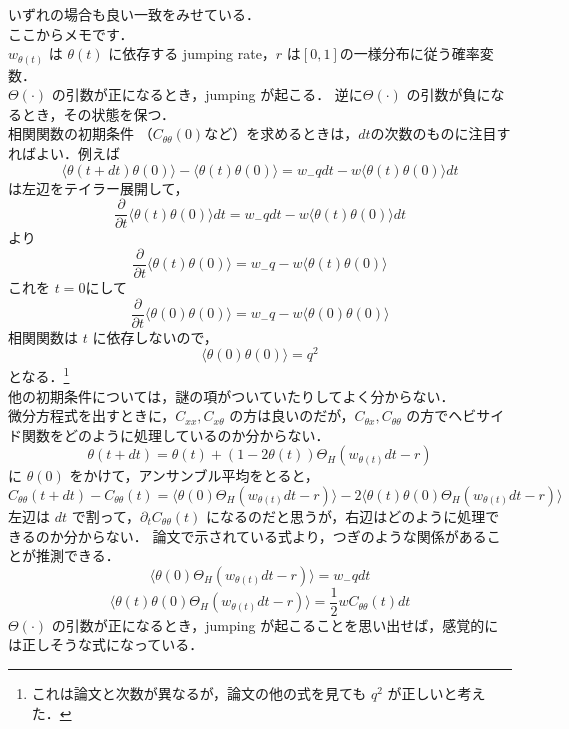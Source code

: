 \documentclass{jsarticle}
\numberwithin{equation}{section}
\theoremstyle{definition}
\newcommand{\ave}[1]{\langle #1 \rangle}
\begin{document}
いずれの場合も良い一致をみせている．\\
\quad ここからメモです．\\
\quad $w_{\theta (t)}$ は $\theta (t)$ に依存する jumping rate，$r$ は$[0,1]$の一様分布に従う確率変数．\\
\quad $\Theta (\cdot)$ の引数が正になるとき，jumping が起こる．
逆に$\Theta (\cdot)$ の引数が負になるとき，その状態を保つ．\\
相関関数の初期条件 （$C_{\theta \theta} (0)$など）を求めるときは，$dt$の次数のものに注目すればよい．例えば
\begin{equation}
  \ave{\theta(t+dt)\theta(0)} - \ave{\theta(t)\theta(0)} = w_- q dt - w \ave{\theta(t)\theta(0)}dt 
\end{equation}
は左辺をテイラー展開して，
\begin{equation}
  \frac{\partial}{\partial t} \ave{\theta(t)\theta(0)} dt = w_- q dt - w \ave{\theta(t)\theta(0)}dt
\end{equation}
より 
\begin{equation}
  \frac{\partial}{\partial t} \ave{\theta(t)\theta(0)} = w_- q - w \ave{\theta(t)\theta(0)}  
\end{equation}
これを $t = 0$にして 
\begin{equation}
  \frac{\partial}{\partial t} \ave{\theta(0)\theta(0)} = w_- q - w \ave{\theta(0)\theta(0)}
\end{equation}
相関関数は $t$ に依存しないので，
\begin{equation}
  \ave{\theta(0)\theta(0)} = q^2
\end{equation}
となる．\footnote{これは論文と次数が異なるが，論文の他の式を見ても $q^2$ が正しいと考えた．}\\
\quad 他の初期条件については，謎の項がついていたりしてよく分からない．\\
\quad 微分方程式を出すときに，$C_{xx}, C_{x \theta}$ の方は良いのだが，$C_{\theta x}, C_{\theta \theta}$ の方でヘビサイド関数をどのように処理しているのか分からない．
\begin{equation}
  \theta (t+dt) = \theta (t) + (1 -2 \theta(t)) \Theta_H (w_{\theta(t)}dt - r) 
\end{equation}
に $\theta (0)$ をかけて，アンサンブル平均をとると，
\begin{equation}
  C_{\theta \theta} (t+dt) - C_{\theta \theta }(t) = \ave{ \theta (0) \Theta_H (w_{\theta(t)}dt - r)} - 2\ave{ \theta (t) \theta(0) \Theta_H (w_{\theta(t)}dt - r)}
\end{equation}
左辺は $dt$ で割って，$\partial_t C_{\theta \theta} (t)$ になるのだと思うが，右辺はどのように処理できるのか分からない．
論文で示されている式より，つぎのような関係があることが推測できる．
\begin{equation}
  \ave{ \theta (0) \Theta_H (w_{\theta(t)}dt - r)} = w_- q dt 
\end{equation}
\begin{equation}
  \ave{ \theta (t) \theta(0) \Theta_H (w_{\theta(t)}dt - r)} = \frac{1}{2} w C_{\theta \theta}(t) dt
\end{equation}
$\Theta (\cdot)$ の引数が正になるとき，jumping が起こることを思い出せば，感覚的には正しそうな式になっている．
\end{document}
